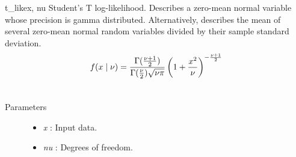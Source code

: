 \hypertarget{pymc.distributions.t_like}{}\begin{funcdesc}{t\_like}{x, nu}
Student's T log-likelihood. Describes a zero-mean normal variable whose precision is
gamma distributed. Alternatively, describes the mean of several zero-mean normal
random variables divided by their sample standard deviation.
\begin{gather}
\begin{split}f(x \mid \nu) = \frac{\Gamma(\frac{\nu+1}{2})}{\Gamma(\frac{\nu}{2}) \sqrt{\nu\pi}} \left( 1 + \frac{x^2}{\nu} \right)^{-\frac{\nu+1}{2}}\end{split}\notag\\\begin{split}\end{split}\notag
\end{gather}\begin{description}
\item[Parameters] \leavevmode\begin{itemize}
\item {} 
\emph{x} : Input data.

\item {} 
\emph{nu} : Degrees of freedom.

\end{itemize}

\end{description}
\end{funcdesc}

